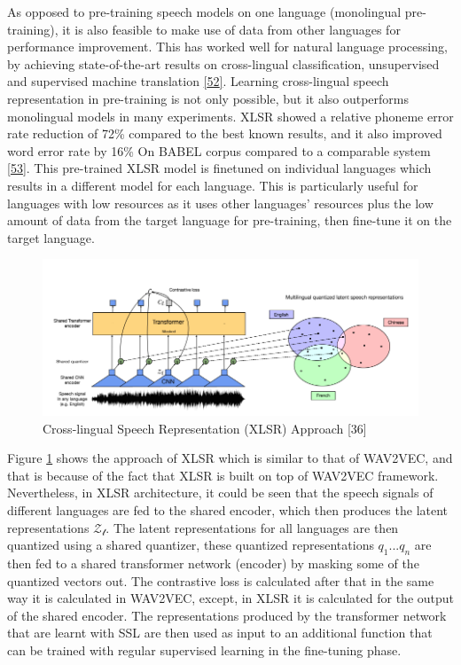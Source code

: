 \documentclass[
  a4paper,
]{article}
\begin{document}
As opposed to pre-training speech models on one language (monolingual
pre-training), it is also feasible to make use of data from other
languages for performance improvement. This has worked well for natural
language processing, by achieving state-of-the-art results on
cross-lingual classification, unsupervised and supervised machine
translation \protect\hyperlink{ref-lample2019crosslingual}{{[}52{]}}.
Learning cross-lingual speech representation in pre-training is not only
possible, but it also outperforms monolingual models in many
experiments. XLSR showed a relative phoneme error rate reduction of 72\%
compared to the best known results, and it also improved word error rate
by 16\% On BABEL corpus compared to a comparable system
\protect\hyperlink{ref-conneau2020unsupervised}{{[}53{]}}. This
pre-trained XLSR model is finetuned on individual languages which
results in a different model for each language. This is particularly
useful for languages with low resources as it uses other languages'
resources plus the low amount of data from the target language for
pre-training, then fine-tune it on the target language.

\begin{figure}

{\centering \includegraphics{xlsr} 

}

\caption{Cross-lingual Speech Representation (XLSR) Approach [36]}\label{fig:xlsr}
\end{figure}

Figure \ref{fig:xlsr} shows the approach of XLSR which is similar to
that of WAV2VEC, and that is because of the fact that XLSR is built on
top of WAV2VEC framework. Nevertheless, in XLSR architecture, it could
be seen that the speech signals of different languages are fed to the
shared encoder, which then produces the latent representations
\(\mathcal{Z_t}\). The latent representations for all languages are then
quantized using a shared quantizer, these quantized representations
\(q_1 ...q_n\) are then fed to a shared transformer network (encoder) by
masking some of the quantized vectors out. The contrastive loss is
calculated after that in the same way it is calculated in WAV2VEC,
except, in XLSR it is calculated for the output of the shared encoder.
The representations produced by the transformer network that are learnt
with SSL are then used as input to an additional function that can be
trained with regular supervised learning in the fine-tuning phase.
\end{document}
